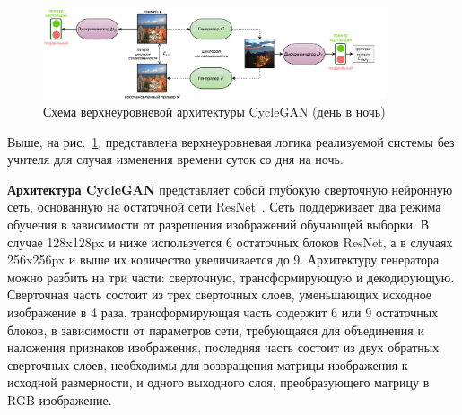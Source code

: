 \documentclass[11pt,a4paper]{extarticle}
\begin{document}
			\begin{figure}[ht]
				\centering
				\includegraphics[width=0.9\textwidth]{img/cyclegan_model}
				\caption[Схема верхнеуровневой архитектуры CycleGAN (день в ночь)]{Схема верхнеуровневой архитектуры CycleGAN (день в ночь)\footnotemark}
				\label{pic:cyclegan_model}
			\end{figure}  
			\noindent
			Выше, на рис.~\ref{pic:cyclegan_model}, представлена верхнеуровневая логика реализуемой системы без учителя для случая изменения времени суток со дня на ночь. 
			
			\textbf{Архитектура CycleGAN} представляет собой глубокую сверточную нейронную сеть, основанную на остаточной сети ResNet~\cite{resnet}.
			Сеть поддерживает два режима обучения в зависимости от разрешения изображений обучающей выборки.
			В случае 128x128px и ниже используется 6 остаточных блоков ResNet, а в случаях 256x256px и выше их количество увеличивается до 9.
			Архитектуру генератора можно разбить на три части: сверточную, трансформирующую и декодирующую.
			Сверточная часть состоит из трех сверточных слоев, уменьшающих исходное изображение в 4 раза,
			трансформирующая часть содержит 6 или 9 остаточных блоков, в зависимости от параметров сети, требующаяся для объединения и наложения признаков изображения,
			последняя часть состоит из двух обратных сверточных слоев, необходимы для возвращения матрицы изображения к исходной размерности, и одного выходного слоя, преобразующего матрицу в RGB изображение.
			
\end{document}
